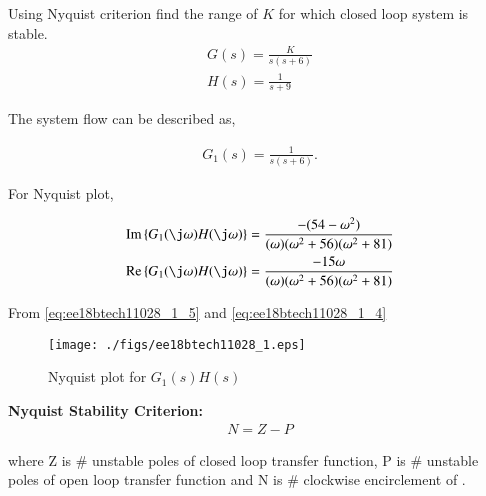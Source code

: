 \item Using Nyquist criterion find the range of $K$ for which closed loop system is stable.
\begin{align}
    G(s) = \frac{K}{s(s+6)}
    \label{eq:ee18btech11028_1_1}
\\
    H(s) = \frac{1}{s+9}
    \label{eq:ee18btech11028_1_2}
\end{align}

\solution
The system flow can be described as,

\begin{figure}[!ht]
    \begin{center}
        \resizebox{\columnwidth}{!}{}
    \end{center}
    \caption{}  
    \label{fig:ee18btech11028_1_fig1}
\end{figure}


\begin{align}
    G_{1}(s) = \frac{1}{s(s+6)}. 
    \label{eq:ee18btech11028_1_3}
\end{align}

For Nyquist plot, 

\begin{align}
    \text{Im} \cbrak{G_{1}(\j \omega)H(\j \omega)} &= \frac{-(54 - \omega^{2})}{(\omega)(\omega^{2}+56)(\omega^{2} + 81)}
    \label{eq:ee18btech11028_1_5}
\\
    \text{Re} \cbrak{G_{1}(\j \omega)H(\j \omega)} &= \frac{-15 \omega}{(\omega)(\omega^{2}+56)(\omega^{2} + 81)}
    \label{eq:ee18btech11028_1_4}
\end{align}

From \eqref{eq:ee18btech11028_1_5} and \eqref{eq:ee18btech11028_1_4}

\begin{figure}[!h]
\texttt{[image: ./figs/ee18btech11028\_1.eps]}
    \centering
  \caption{Nyquist plot for $G_{1}(s)H(s)$}
  \label{fig:ee18btech11028_1_fig2}
\end{figure}


\textbf{Nyquist Stability Criterion:}
\begin{align}
    N = Z - P
\end{align}

where Z is \# unstable poles of closed loop transfer function, P is \# unstable poles of open loop transfer function
and N is \# clockwise encirclement of .

